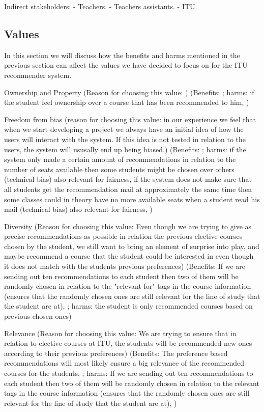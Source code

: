 Indirect stakeholders:
- Teachers.
- Teachers assistants.
- ITU. 




\subsection{Values}

In this section we will discuss how the benefits and harms mentioned in the previous section can affect the values we have decided to focus on for the ITU recommender system. 




Ownership and Property (Reason for choosing this value: ) 	(Benefits:     ; harms: if the student feel ownership over a course that has been recommended to him, )

Freedom from bias  (reason for choosing this value: in our experience we feel that when we start developing a project we always have an initial idea of how the users will interact with the system. If this idea is not tested in relation to the users, the system will ususally end up being biased.)		(Benefits:     ; harms: if the system only made a certain amount of recommendations in relation to the number of seats available then some students might be chosen over others (technical bias) also relevant for fairness, if the system does not make sure that all students get the recommendation mail at approximately the same time then some classes could in theory have no more available seats when a student read his mail (technical bias) also relevant for fairness, )

Diversity (Reason for choosing this value: Even though we are trying to give as precise recommendations as possible in relation the previous elective courses chosen by the student, we still want to bring an element of surprise into play, and maybe recommend a course that the student could be interested in even though it does not match with the students previous preferences)				(Benefits: If we are sending out ten recommendations to each student then two of them will be randomly chosen in relation to the "relevant for" tags in the course information (ensures that the randomly chosen ones are still relevant for the line of study that the student are at),    ; harms: the student is only recommended courses based on previous chosen ones)

Relevance (Reason for choosing this value: We are trying to ensure that in relation to elective courses at ITU, the students will be recommended new ones according to their previous preferences) 			(Benefits: The preference based recommendations will most likely ensure a big relevance of the recommended courses for the students,   ; harms: If we are sending out ten recommendations to each student then two of them will be randomly chosen in relation to the relevant tags in the course information (ensures that the randomly chosen ones are still relevant for the line of study that the student are at), )

